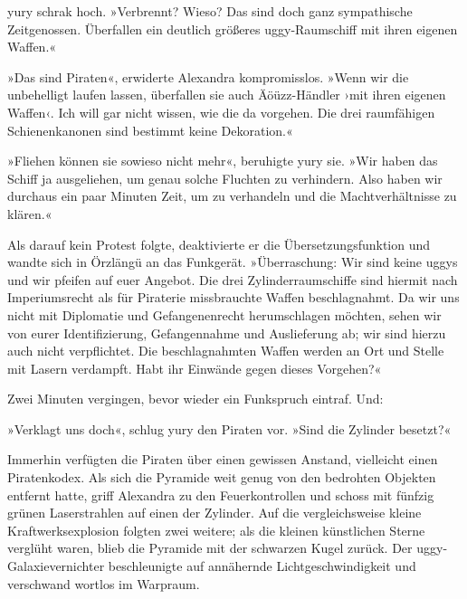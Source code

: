 yury schrak hoch. »Verbrennt? Wieso? Das sind doch ganz sympathische Zeitgenossen. Überfallen ein deutlich größeres uggy-Raumschiff mit ihren eigenen Waffen.«

»Das sind Piraten«, erwiderte Alexandra kompromisslos. »Wenn wir die unbehelligt laufen lassen, überfallen sie auch Äöüzz-Händler ›mit ihren eigenen Waffen‹. Ich will gar nicht wissen, wie die da vorgehen. Die drei raumfähigen Schienenkanonen sind bestimmt keine Dekoration.«

»Fliehen können sie sowieso nicht mehr«, beruhigte yury sie. »Wir haben das Schiff ja ausgeliehen, um genau solche Fluchten zu verhindern. Also haben wir durchaus ein paar Minuten Zeit, um zu verhandeln und die Machtverhältnisse zu klären.«

Als darauf kein Protest folgte, deaktivierte er die Übersetzungsfunktion und wandte sich in Örzlängü an das Funkgerät. »Überraschung: Wir sind keine uggys und wir pfeifen auf euer Angebot. Die drei Zylinderraumschiffe sind hiermit nach Imperiumsrecht als für Piraterie missbrauchte Waffen beschlagnahmt. Da wir uns nicht mit Diplomatie und Gefangenenrecht herumschlagen möchten, sehen wir von eurer Identifizierung, Gefangennahme und Auslieferung ab; wir sind hierzu auch nicht verpflichtet. Die beschlagnahmten Waffen werden an Ort und Stelle mit Lasern verdampft. Habt ihr Einwände gegen dieses Vorgehen?«

Zwei Minuten vergingen, bevor wieder ein Funkspruch eintraf.  Und: 

»Verklagt uns doch«, schlug yury den Piraten vor. »Sind die Zylinder besetzt?«


Immerhin verfügten die Piraten über einen gewissen Anstand, vielleicht einen Piratenkodex. Als sich die Pyramide weit genug von den bedrohten Objekten entfernt hatte, griff Alexandra zu den Feuerkontrollen und schoss mit fünfzig grünen Laserstrahlen auf einen der Zylinder. Auf die vergleichsweise kleine Kraftwerksexplosion folgten zwei weitere; als die kleinen künstlichen Sterne verglüht waren, blieb die Pyramide mit der schwarzen Kugel zurück. Der uggy-Galaxievernichter beschleunigte auf annähernde Lichtgeschwindigkeit und verschwand wortlos im Warpraum.

